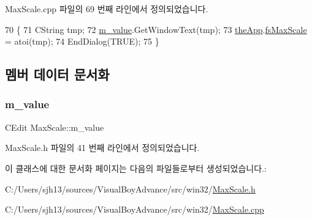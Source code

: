 Max\+Scale.\+cpp 파일의 69 번째 라인에서 정의되었습니다.


\begin{DoxyCode}
70 \{
71   CString tmp;
72   \mbox{\hyperlink{class_max_scale_a95c50937477be6af50f60f022b5fd4f8}{m\_value}}.GetWindowText(tmp);
73   \mbox{\hyperlink{_v_b_a_8cpp_a8095a9d06b37a7efe3723f3218ad8fb3}{theApp}}.\mbox{\hyperlink{class_v_b_a_a1a4cfe79496ea8a029bc591f33c489d6}{fsMaxScale}} = atoi(tmp);
74   EndDialog(TRUE);
75 \}
\end{DoxyCode}


\subsection{멤버 데이터 문서화}
\mbox{\label{class_max_scale_a95c50937477be6af50f60f022b5fd4f8}} 
\subsubsection{\texorpdfstring{m\+\_\+value}{m\_value}}
{\footnotesize\ttfamily C\+Edit Max\+Scale\+::m\+\_\+value}



Max\+Scale.\+h 파일의 41 번째 라인에서 정의되었습니다.



이 클래스에 대한 문서화 페이지는 다음의 파일들로부터 생성되었습니다.\+:\begin{DoxyCompactItemize}
\item 
C\+:/\+Users/sjh13/sources/\+Visual\+Boy\+Advance/src/win32/\mbox{\hyperlink{_max_scale_8h}{Max\+Scale.\+h}}\item 
C\+:/\+Users/sjh13/sources/\+Visual\+Boy\+Advance/src/win32/\mbox{\hyperlink{_max_scale_8cpp}{Max\+Scale.\+cpp}}\end{DoxyCompactItemize}
